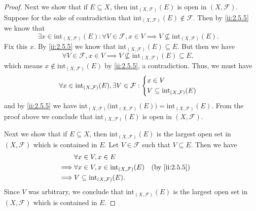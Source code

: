 \begin{proof}
  Next we show that if \(E \subseteq X\), then \(\text{int}_{(X, \mathcal{F})}(E)\) is open in \((X, \mathcal{F})\).
  Suppose for the sake of contradiction that \(\text{int}_{(X, \mathcal{F})}(E) \notin \mathcal{F}\).
  Then by \cref{ii:2.5.5} we know that
  \[
    \exists x \in \text{int}_{(X, \mathcal{F})}(E) : \forall V \in \mathcal{F}, x \in V \implies V \not\subseteq \text{int}_{(X, \mathcal{F})}(E).
  \]
  Fix this \(x\).
  By \cref{ii:2.5.5} we know that \(\text{int}_{(X, \mathcal{F})}(E) \subseteq E\).
  But then we have
  \[
    \forall V \in \mathcal{F}, x \in V \implies V \not\subseteq \text{int}_{(X, \mathcal{F})}(E) \subseteq E,
  \]
  which means \(x \notin \text{int}_{(X, \mathcal{F})}(E)\) by \cref{ii:2.5.5}, a contradiction.
  Thus, we must have
  \[
    \forall x \in \text{int}_{(X, \mathcal{F})}(E), \exists V \in \mathcal{F} : \begin{dcases}
      x \in V \\
      V \subseteq \text{int}_{(X, \mathcal{F})}(E)
    \end{dcases}
  \]
  and by \cref{ii:2.5.5} we have \(\text{int}_{(X, \mathcal{F})}\big(\text{int}_{(X, \mathcal{F})}(E)\big) = \text{int}_{(X, \mathcal{F})}(E)\).
  From the proof above we conclude that \(\text{int}_{(X, \mathcal{F})}(E)\) is open in \((X, \mathcal{F})\).

  Next we show that if \(E \subseteq X\), then \(\text{int}_{(X, \mathcal{F})}(E)\) is the largest open set in \((X, \mathcal{F})\) which is contained in \(E\).
  Let \(V \in \mathcal{F}\) such that \(V \subseteq E\).
  Then we have
  \begin{align*}
             & \forall x \in V, x \in E                                                   \\
    \implies & \forall x \in V, x \in \text{int}_{(X, \mathcal{F})}(E) &  & \by{ii:2.5.5} \\
    \implies & V \subseteq \text{int}_{(X, \mathcal{F})}(E).
  \end{align*}
  Since \(V\) was arbitrary, we conclude that \(\text{int}_{(X, \mathcal{F})}(E)\) is the largest open set in \((X, \mathcal{F})\) which is contained in \(E\).


\end{proof}
